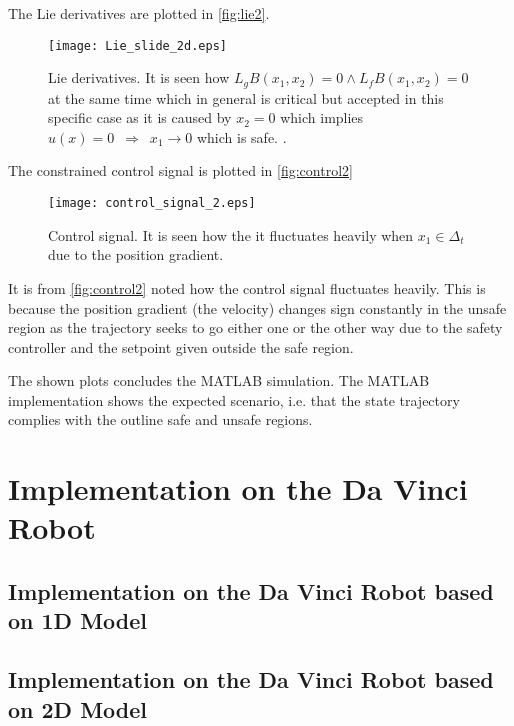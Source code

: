 The Lie derivatives are plotted in \autoref{fig:lie2}.
\begin{figure}[H]
	\center
		\texttt{[image: Lie\_slide\_2d.eps]}
	\caption{Lie derivatives. It is seen how $L_gB(x_1,x_2) = 0 \wedge L_fB(x_1,x_2) = 0$ at the same time which in general is critical but accepted in this specific case as it is caused by $x_2=0$ which implies $u(x)=0 \,\,\, \Rightarrow \,\,\, x_1 \rightarrow 0$ which is safe. {\color{green}{RAFAL: Er det noget lort eller hvad?}}.}
	\label{fig:lie2}
\end{figure}
The constrained control signal is plotted in \autoref{fig:control2}
\begin{figure}[H]
	\center
		\texttt{[image: control\_signal\_2.eps]}
	\caption{Control signal. It is seen how the it fluctuates heavily when $x_1 \in \Delta_t$ due to the position gradient.}
	\label{fig:control2}
\end{figure}
It is from \autoref{fig:control2} noted how the control signal fluctuates heavily. This is because the position gradient (the velocity) changes sign constantly in the unsafe region as the trajectory seeks to go either one or the other way due to the safety controller and the setpoint given outside the safe region.

The shown plots concludes the MATLAB simulation. The MATLAB implementation shows the expected scenario, i.e. that the state trajectory complies with the outline safe and unsafe regions.
\section{Implementation on the Da Vinci Robot}
\subsection{Implementation on the Da Vinci Robot based on 1D Model}

\subsection{Implementation on the Da Vinci Robot based on 2D Model}
